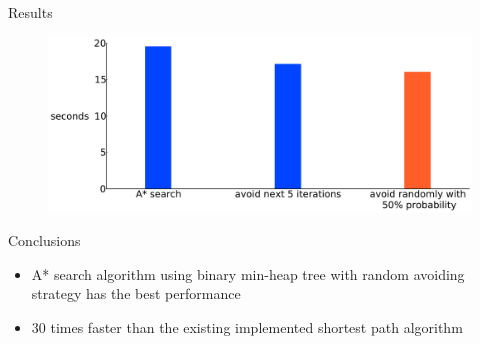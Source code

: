 \documentclass[final]{beamer}
\begin{document}
\begin{frame}{ }
\begin{columns}[t]
\begin{column}{.26\linewidth}
\begin{block}{Results}
\begin{figure}
                \includegraphics[width=\linewidth]{img/random_runtime}
            \end{figure}
        \end{block}
        \begin{block}{Conclusions}
            \begin{itemize}
                \itemsep.4em
                \item A* search algorithm using binary min-heap tree with random avoiding strategy has the \alert{best performance}
                \item \alert{30 times faster} than the existing implemented shortest path algorithm
            \end{itemize}
        \end{block}
    \end{column}
\end{columns}
\end{frame}
\end{document}
